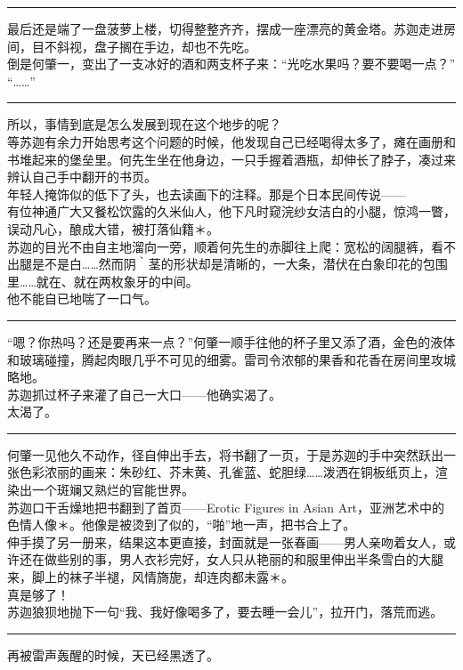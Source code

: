 \documentclass[oneside,11pt]{memoir} %
\begin{document}
\begin{CJK}{UTF8}{gbsn}
\rule{-3pt}{30pt}
    最后还是端了一盘菠萝上楼，切得整整齐齐，摆成一座漂亮的黄金塔。苏迦走进房间，目不斜视，盘子搁在手边，却也不先吃。\\\indent
    倒是何肇一，变出了一支冰好的酒和两支杯子来：“光吃水果吗？要不要喝一点？”\\\indent
    “……”\\\indent
\rule{-3pt}{30pt}
    所以，事情到底是怎么发展到现在这个地步的呢？\\\indent
    等苏迦有余力开始思考这个问题的时候，他发现自己已经喝得太多了，瘫在画册和书堆起来的堡垒里。何先生坐在他身边，一只手握着酒瓶，却伸长了脖子，凑过来辨认自己手中翻开的书页。\\\indent
    年轻人掩饰似的低下了头，也去读画下的注释。那是个日本民间传说——\\\indent
    有位神通广大又餐松饮露的久米仙人，他下凡时窥浣纱女洁白的小腿，惊鸿一瞥，误动凡心，酿成大错，被打落仙籍＊。\\\indent
    苏迦的目光不由自主地溜向一旁，顺着何先生的赤脚往上爬：宽松的阔腿裤，看不出腿是不是白……然而阴｀茎的形状却是清晰的，一大条，潜伏在白象印花的包围里……就在、就在两枚象牙的中间。\\\indent
    他不能自已地喘了一口气。\\\indent
\rule{-3pt}{30pt}
    “嗯？你热吗？还是要再来一点？”何肇一顺手往他的杯子里又添了酒，金色的液体和玻璃碰撞，腾起肉眼几乎不可见的细雾。雷司令浓郁的果香和花香在房间里攻城略地。\\\indent
    苏迦抓过杯子来灌了自己一大口——他确实渴了。\\\indent
    太渴了。\\\indent
\rule{-3pt}{30pt}
    何肇一见他久不动作，径自伸出手去，将书翻了一页，于是苏迦的手中突然跃出一张色彩浓丽的画来：朱砂红、芥末黄、孔雀蓝、蛇胆绿……泼洒在铜板纸页上，渲染出一个斑斓又熟烂的官能世界。\\\indent
    苏迦口干舌燥地把书翻到了首页——Erotic Figures in Asian Art，亚洲艺术中的色情人像＊。他像是被烫到了似的，“啪”地一声，把书合上了。\\\indent
    伸手摸了另一册来，结果这本更直接，封面就是一张春画——男人亲吻着女人，或许还在做些别的事，男人衣衫完好，女人只从艳丽的和服里伸出半条雪白的大腿来，脚上的袜子半褪，风情旖旎，却连肉都未露＊。\\\indent
    真是够了！\\\indent
    苏迦狼狈地抛下一句“我、我好像喝多了，要去睡一会儿”，拉开门，落荒而逃。\\\indent
\rule{-3pt}{30pt}
    再被雷声轰醒的时候，天已经黑透了。\\\indent

\end{CJK}
\end{document}
